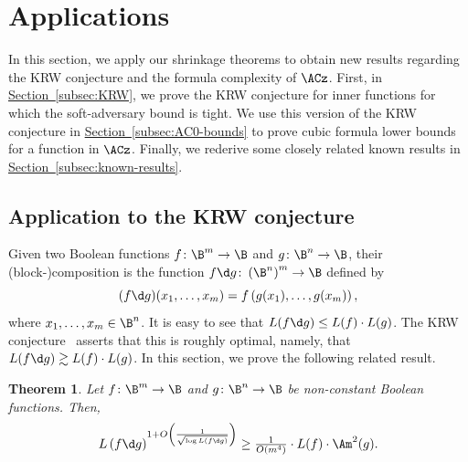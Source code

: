 \documentclass[11pt]{article}
\numberwithin{equation}{section}
\newtheorem{theorem}{Theorem}[section]
\theoremstyle{definition}
\theoremstyle{plain}
\newcommand{\expref}[2]{\hyperref[#2]{#1~\ref{#2}}}
\theoremstyle{definition}\newtheorem{notation}[theorem]{Notation}\theoremstyle{plain}
\begin{document}
\section{\label{sec:applications}Applications}

In this section, we apply our shrinkage theorems to obtain new results
regarding the KRW conjecture and the formula complexity of $\ACz$.
First, in \expref{Section}{subsec:KRW}, we prove the KRW conjecture for inner
functions for which the soft-adversary bound is tight. We use this
version of the KRW conjecture in \expref{Section}{subsec:AC0-bounds} to prove
cubic formula lower bounds for a function in $\ACz$. Finally, we
rederive some closely related known results in \expref{Section}{subsec:known-results}.

\subsection{\label{subsec:KRW}Application to the KRW conjecture}

Given two Boolean functions $f\colon\B^{m}\to\B$ and $g\colon\B^{n}\to\B$,
their (block-)\-composition is the function $f\d g\colon\left(\B^{n}\right)^{m}\to\B$
defined by 
\[
(f\d g)(x_{1},\ldots,x_{m})=f\left(g(x_{1}),\ldots,g(x_{m})\right),
\]
where $x_{1},\ldots,x_{m}\in\B^{n}$. It is easy to see that $L(f\d g)\le L(f)\cdot L(g)$.
The KRW conjecture~\cite{KRW95} asserts that this is roughly optimal,
namely, that $L(f\d g)\gtrsim L(f)\cdot L(g)$. In this section,
we prove the following related result. 

\begin{theorem}
\label{thm:composition-theorem}Let $f\colon\B^{m}\to\B$ and $g\colon\B^{n}\to\B$
be non-constant Boolean functions. Then, 
\[
L\left(f\d g\right)^{1+O\left(\frac{1}{\sqrt{\log L(f\d g)}}\right)}\geq\tfrac{1}{O(m^{4})}\cdot L(f)\cdot\Am^{2}(g).
\]
\end{theorem}

%
%
%
%
%
%
%
%
%
%
%
%
%
\end{document}
